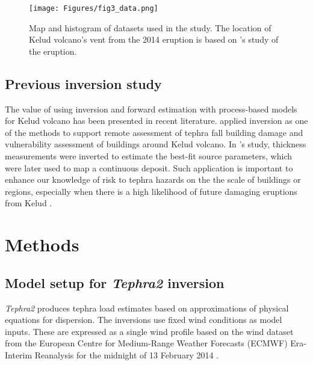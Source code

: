 \documentclass[a4paper,fleqn]{cas-sc}
\begin{document}
    \begin{figure}[htbp]
    \centering
    \texttt{[image: Figures/fig3\_data.png]}
    \caption{Map and histogram of datasets used in the study. The location of Kelud volcano's vent from the 2014 eruption is based on \cite{goode2019insights}'s study of the eruption.}
    \label{fig:datasets}
    \end{figure}

\subsection{Previous inversion study}

The value of using inversion and forward estimation with process-based models for Kelud volcano has been presented in recent literature. \cite{williams2020} applied inversion as one of the methods to support remote assessment of tephra fall building damage and vulnerability assessment of buildings around Kelud volcano. In \cite{williams2020}'s study, thickness measurements were inverted to estimate the best-fit source parameters, which were later used to map a continuous deposit. Such application is important to enhance our knowledge of risk to tephra hazards on the the scale of buildings or regions, especially when there is a high likelihood of future damaging eruptions from Kelud \citep{MAENO201924}.

\section{Methods}\label{section-methods}

\subsection{Model setup for \textit{Tephra2} inversion}\label{subsection-met-setup}

\textit{Tephra2} produces tephra load estimates based on approximations of physical equations for dispersion. The inversions use fixed wind conditions as model inputs. These are expressed as a single wind profile based on the wind dataset from the European Centre for Medium-Range Weather Forecasts (ECMWF) Era-Interim Reanalysis for the midnight of 13 February 2014 \citep{dee2011era}. 
\end{document}
